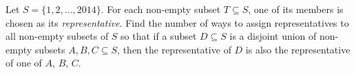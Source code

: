 Let $S = \{1,2,\dots,2014\}$. For each non-empty subset $T \subseteq S$, one of its members is chosen as its \emph{representative}. Find the number of ways to assign representatives to all non-empty subsets of $S$ so that if a subset $D \subseteq S$ is a disjoint union of non-empty subsets $A, B, C \subseteq S$, then the representative of $D$ is also the representative of one of $A$, $B$, $C$.